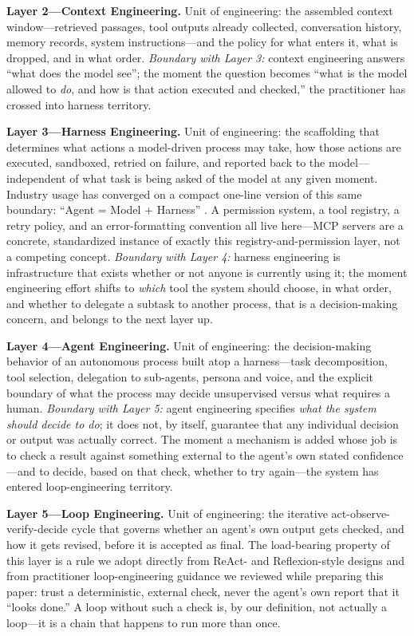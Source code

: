 \documentclass[journal]{IEEEtran}
\begin{document}
\textbf{Layer 2---Context Engineering.} Unit of engineering: the assembled context window---retrieved passages, tool outputs already collected, conversation history, memory records, system instructions---and the policy for what enters it, what is dropped, and in what order. \emph{Boundary with Layer 3:} context engineering answers ``what does the model see''; the moment the question becomes ``what is the model allowed to \emph{do}, and how is that action executed and checked,'' the practitioner has crossed into harness territory.

\textbf{Layer 3---Harness Engineering.} Unit of engineering: the scaffolding that determines what actions a model-driven process may take, how those actions are executed, sandboxed, retried on failure, and reported back to the model---independent of what task is being asked of the model at any given moment. Industry usage has converged on a compact one-line version of this same boundary: ``Agent = Model + Harness'' \cite{trivedy2026anatomy}. A permission system, a tool registry, a retry policy, and an error-formatting convention all live here---MCP servers are a concrete, standardized instance of exactly this registry-and-permission layer, not a competing concept. \emph{Boundary with Layer 4:} harness engineering is infrastructure that exists whether or not anyone is currently using it; the moment engineering effort shifts to \emph{which} tool the system should choose, in what order, and whether to delegate a subtask to another process, that is a decision-making concern, and belongs to the next layer up.

\textbf{Layer 4---Agent Engineering.} Unit of engineering: the decision-making behavior of an autonomous process built atop a harness---task decomposition, tool selection, delegation to sub-agents, persona and voice, and the explicit boundary of what the process may decide unsupervised versus what requires a human. \emph{Boundary with Layer 5:} agent engineering specifies \emph{what the system should decide to do}; it does not, by itself, guarantee that any individual decision or output was actually correct. The moment a mechanism is added whose job is to check a result against something external to the agent's own stated confidence---and to decide, based on that check, whether to try again---the system has entered loop-engineering territory.

\textbf{Layer 5---Loop Engineering.} Unit of engineering: the iterative act-observe-verify-decide cycle that governs whether an agent's own output gets checked, and how it gets revised, before it is accepted as final. The load-bearing property of this layer is a rule we adopt directly from ReAct- and Reflexion-style designs and from practitioner loop-engineering guidance we reviewed while preparing this paper: trust a deterministic, external check, never the agent's own report that it ``looks done.'' A loop without such a check is, by our definition, not actually a loop---it is a chain that happens to run more than once.
\end{document}
